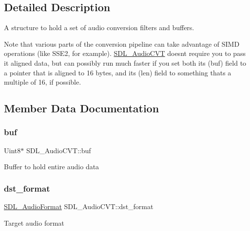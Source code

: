 \subsection{Detailed Description}
A structure to hold a set of audio conversion filters and buffers. 

Note that various parts of the conversion pipeline can take advantage of S\+I\+MD operations (like S\+S\+E2, for example). \mbox{\hyperlink{struct_s_d_l___audio_c_v_t}{S\+D\+L\+\_\+\+Audio\+C\+VT}} doesn\textquotesingle{}t require you to pass it aligned data, but can possibly run much faster if you set both its (buf) field to a pointer that is aligned to 16 bytes, and its (len) field to something that\textquotesingle{}s a multiple of 16, if possible. 

\subsection{Member Data Documentation}
\mbox{\label{struct_s_d_l___audio_c_v_t_a080db27b929efa983c5161360ffce310}} 
\subsubsection{\texorpdfstring{buf}{buf}}
{\footnotesize\ttfamily Uint8$\ast$ S\+D\+L\+\_\+\+Audio\+C\+V\+T\+::buf}

Buffer to hold entire audio data \mbox{\label{struct_s_d_l___audio_c_v_t_a8f890d017be857a3b048bf00525736c6}} 
\subsubsection{\texorpdfstring{dst\_format}{dst\_format}}
{\footnotesize\ttfamily \mbox{\hyperlink{_s_d_l__audio_8h_a491ed103fd25d920c4e6b7495217ce66}{S\+D\+L\+\_\+\+Audio\+Format}} S\+D\+L\+\_\+\+Audio\+C\+V\+T\+::dst\+\_\+format}

Target audio format \mbox{\label{struct_s_d_l___audio_c_v_t_a35093b3ad3331c17416c593a76012b63}} 

